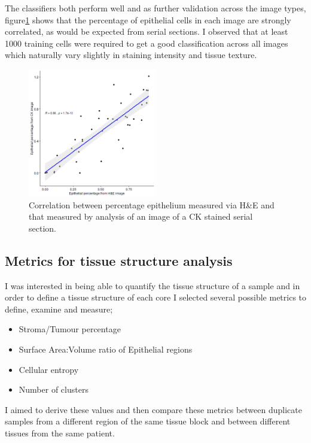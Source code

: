 The classifiers both perform well and as further validation across the image types, figure\ref{fig:correlation_tumourarea} shows that the percentage of epithelial cells in each image are strongly correlated, as would be expected from serial sections. I observed that at least 1000 training cells were required to get a good classification across all images which naturally vary slightly in staining intensity and tissue texture.

\begin{figure}
    \centering
    \includegraphics[width=0.5\textwidth]{Chapter3/Figs/correlation_TS_he_Ck.png}
    \caption{Correlation between percentage epithelium measured via H\&E and that measured by analysis of an image of a CK stained serial section.}
    \label{fig:correlation_tumourarea}
\end{figure}


\subsection{Metrics for tissue structure analysis}

I was interested in being able to quantify the tissue structure of a sample and in order to define a tissue structure of each core I selected several possible metrics to define, examine and measure;

\begin{itemize}
    \item Stroma/Tumour percentage
    \item Surface Area:Volume ratio of Epithelial regions
    \item Cellular entropy
    \item Number of clusters 
\end{itemize}

I aimed to derive these values and then compare these metrics between duplicate samples from a different region of the same tissue block and between different tissues from the same patient.

